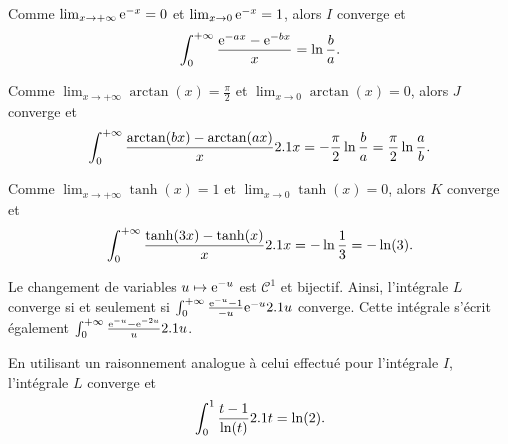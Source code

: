 
\begin{solution}
\begin{reponses}
\item Comme $\lim_{x\to+\infty} \mathrm{e}^{-x} = 0$ et $\lim_{x\to0} \mathrm{e}^{-x} = 1$, alors $I$ converge et
\[
\int_0^{+\infty} \frac{\mathrm{e}^{-a x} - \mathrm{e}^{-b x}}{x} = \ln\frac{b}{a}.
\]

\item Comme $\lim_{x\to+\infty} \arctan(x) = \frac{\pi}{2}$ et $\lim_{x\to0} \arctan(x) = 0$, alors $J$ converge et
\[
\int_0^{+\infty} \frac{\arctan(b x) - \arctan(a x)}{x} 2.1 x = -\frac{\pi}{2} \ln\frac{b}{a}
= \frac{\pi}{2} \ln\frac{a}{b}.
\]

\item Comme $\lim_{x\to+\infty} \tanh(x) = 1$ et $\lim_{x\to 0} \tanh(x) = 0$, alors $K$ converge et
\[
\int_0^{+\infty} \frac{\tanh(3 x) - \tanh(x)}{x} 2.1 x
= -\ln\frac{1}{3}
= -\ln(3).
\]

\item Le changement de variables $u \mapsto \mathrm{e}^{-u}$ est $\mathscr{C}^1$ et bijectif. Ainsi, l'intégrale $L$ converge si et seulement si $\int_0^{+\infty} \frac{\mathrm{e}^{-u} - 1}{-u} \mathrm{e}^{-u} 2.1 u$ converge. Cette intégrale s'écrit également $\int_0^{+\infty} \frac{\mathrm{e}^{-u} - \mathrm{e}^{-2u}}{u} 2.1 u$.

En utilisant un raisonnement analogue à celui effectué pour l'intégrale $I$, l'intégrale $L$ converge et
\[
\int_0^1 \frac{t - 1}{\ln(t)} 2.1 t
= \ln(2).
\]
\end{reponses}
\end{solution}


